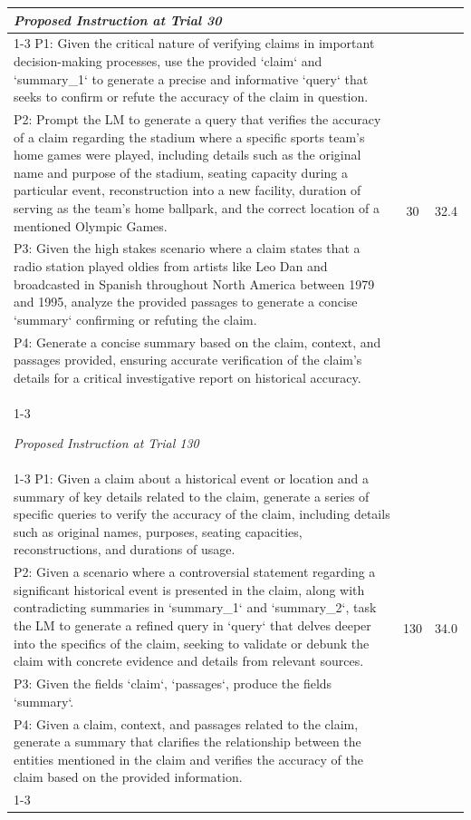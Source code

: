 \begin{table}[ht]
\begin{tabularx}{\textwidth}{Xcc}
\textit{Proposed Instruction at Trial 30} \\
\cline{1-3}
P1: Given the critical nature of verifying claims in important decision-making processes, use the provided `claim` and `summary\_1` to generate a precise and informative `query` that seeks to confirm or refute the accuracy of the claim in question. & \multirow{4}{*}{30} & \multirow{4}{*}{32.4} \\
P2: Prompt the LM to generate a query that verifies the accuracy of a claim regarding the stadium where a specific sports team's home games were played, including details such as the original name and purpose of the stadium, seating capacity during a particular event, reconstruction into a new facility, duration of serving as the team's home ballpark, and the correct location of a mentioned Olympic Games. & & \\
P3: Given the high stakes scenario where a claim states that a radio station played oldies from artists like Leo Dan and broadcasted in Spanish throughout North America between 1979 and 1995, analyze the provided passages to generate a concise `summary` confirming or refuting the claim. & & \\
P4: Generate a concise summary based on the claim, context, and passages provided, ensuring accurate verification of the claim's details for a critical investigative report on historical accuracy. & & \\
\cline{1-3}

\textit{Proposed Instruction at Trial 130} \\
\cline{1-3}
P1: Given a claim about a historical event or location and a summary of key details related to the claim, generate a series of specific queries to verify the accuracy of the claim, including details such as original names, purposes, seating capacities, reconstructions, and durations of usage. & \multirow{4}{*}{130} & \multirow{4}{*}{34.0} \\
P2: Given a scenario where a controversial statement regarding a significant historical event is presented in the claim, along with contradicting summaries in `summary\_1` and `summary\_2`, task the LM to generate a refined query in `query` that delves deeper into the specifics of the claim, seeking to validate or debunk the claim with concrete evidence and details from relevant sources. & & \\
P3: Given the fields `claim`, `passages`, produce the fields `summary`. & & \\
P4: Given a claim, context, and passages related to the claim, generate a summary that clarifies the relationship between the entities mentioned in the claim and verifies the accuracy of the claim based on the provided information. & & \\
\cline{1-3}


\end{tabularx}
\end{table}
